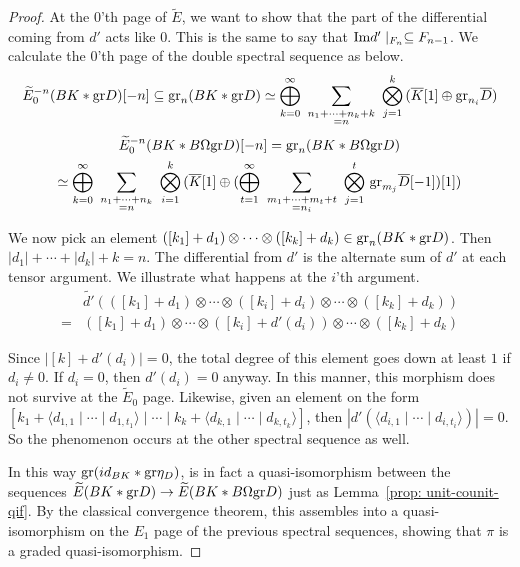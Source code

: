 \documentclass[../thesis.tex]{subfiles}
\begin{document}
\begin{proof}
                At the $0$'th page of $\widetilde{E}$, we want to show that the part of the differential coming from $d'$ acts like $0$. This is the same to say that $\tt{Im}d'\mid_{F_n} \subseteq F_{n-1}$. We calculate the $0$'th page of the double spectral sequence as below.
                \begin{align*}
                    \widetilde{E}_0^{-n}(BK\ast\tt{gr}D)[-n] \subseteq \tt{gr}_n(BK\ast\tt{gr}D) \simeq \bigoplus_{k=0}^\infty\,\,\sum_{\substack{n_1+\cdots + n_k + k \\ = n}}\,\,\bigotimes_{j=1}^k\,(\overline{K}[1]\oplus\tt{gr}_{n_i}\overline{D})
                \end{align*}
                \begin{multline*}
                    \widetilde{E}_0^{-n}(BK\ast B\Omega\tt{gr}D)[-n] = \tt{gr}_n(BK\ast B\Omega\tt{gr}D) \\ 
                    \simeq \bigoplus_{k=0}^\infty\,\,\sum_{\substack{n_1+\cdots + n_k \\ = n}}\,\,\bigotimes_{i=1}^k\,(\overline{K}[1]\oplus(\bigoplus_{t=1}^\infty\,\,\sum_{\substack{m_1+\cdots + m_t + t \\ = n_i}}\,\,\bigotimes_{j=1}^t\,\tt{gr}_{m_j}\overline{D}[-1])[1])
                \end{multline*}

                We now pick an element $([k_1] + d_1) \otimes \cdots \otimes ([k_k] + d_k) \in \tt{gr}_n(BK\ast \tt{gr}D)$. Then $|d_1| + \cdots + |d_k| + k = n$. The differential from $d'$ is the alternate sum of $d'$ at each tensor argument. We illustrate what happens at the $i$'th argument.
                \begin{align*}                    
                    & \widetilde{d'}(([k_1] + d_1) \otimes \cdots \otimes ([k_i] + d_i) \otimes \cdots \otimes ([k_k] + d_k)) \\ 
                    = & ([k_1] + d_1) \otimes \cdots \otimes ([k_i] + d'(d_i)) \otimes \cdots \otimes ([k_k] + d_k) 
                \end{align*}

                Since $|[k]+d'(d_i)| = 0$, the total degree of this element goes down at least $1$ if $d_i \neq 0$. If $d_i = 0$, then $d'(d_i) = 0$ anyway. In this manner, this morphism does not survive at the $\widetilde{E}_0$ page. Likewise, given an element on the form $[k_1 + \langle d_{1,1} \mid \cdots \mid d_{1,t_1} \rangle \mid \cdots \mid k_k + \langle d_{k,1} \mid \cdots \mid d_{k,t_k} \rangle ]$, then $|d'(\langle d_{i,1} \mid \cdots \mid d_{i,t_i} \rangle)| = 0$. So the phenomenon occurs at the other spectral sequence as well.
                
                In this way $\tt{gr}(id_{BK}\ast\tt{gr}\eta_D)$, is in fact a quasi-isomorphism between the sequences $\widetilde{E}(BK\ast\tt{gr}D) \rightarrow \widetilde{E}(BK\ast B\Omega\tt{gr}D)$ just as Lemma~\ref{prop: unit-counit-qif}. By the classical convergence theorem, this assembles into a quasi-isomorphism on the $E_1$ page of the previous spectral sequences, showing that $\pi$ is a graded quasi-isomorphism.
            \end{proof}
\end{document}
